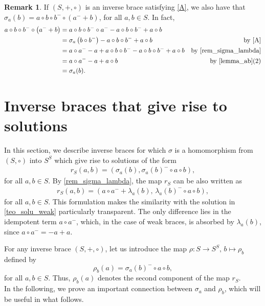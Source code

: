 \documentclass[preprint,1p]{elsarticle}
\theoremstyle{definition}               %
\newtheorem{rem}[theor]{Remark}
\begin{document}
\smallskip

\begin{rem}\label{A*}
    If $(S, +, \circ)$ is an inverse brace satisfying \eqref{A}, we also have that $\sigma_a(b)=a \circ b \circ b^- \circ \left(a^-+b\right)$, for all $a,b \in S$. In fact, 
   \begin{align*}
       a \circ b \circ b^- \circ \left(a^-+b\right)&=a \circ b \circ b^- \circ a^--a \circ b \circ b^-+a \circ b\\
       &=\sigma_a\left(b \circ b^-\right)-a \circ b \circ b^-+a \circ b &\mbox{by \eqref{A}}\\
       &=a \circ a^--a+a \circ b \circ b^--a \circ b \circ b^-+a \circ b &\mbox{by \cref{rem_sigma_lambda}}\\
       &=a \circ a^--a+a \circ b &\mbox{by \cref{lemma_ab}(2)}\\
       &=\sigma_a(b).
   \end{align*}
\end{rem}

\medskip



\section{Inverse braces that give rise to solutions}
In this section, we describe inverse braces for which $\sigma$ is a homomorphism from $(S, \circ)$ into $S^S$
which give rise to solutions of the form
  \begin{align}\label{r_S}
     r_S(a,b)=\left(\sigma_a(b), \sigma_a(b)^-  \circ a \circ b\right),
 \end{align}
 for all $a,b \in S$. 
By \cref{rem_sigma_lambda}, the map $r_S$ can be also written as
\begin{align*}
    r_S(a, b)=\left(a \circ a^-+ \lambda_a(b), \, \lambda_a(b)^- \circ a \circ b\right),
\end{align*}
for all $a,b \in S$. This formulation makes the similarity with the solution in \cref{teo_solu_weak} particularly transparent. The only difference lies in the idempotent term $a \circ a^-$, which, in the case of weak braces, is absorbed by $\lambda_a(b)$, since $a \circ a^-=-a+a$.





\medskip

For any inverse brace $(S, +, \circ)$, let us introduce the map
$\rho: S \to S^S,\, b \mapsto \rho_b$ defined by $$\rho_b(a)=\sigma_a(b)^-  \circ a \circ b,$$
for all $a, b \in S$. Thus, $\rho_b(a)$ denotes the second component of the map $r_S$. \\
In the following, we prove an important connection between $\sigma_a$ and $\rho_b$, which will be useful in what follows.
\end{document}
